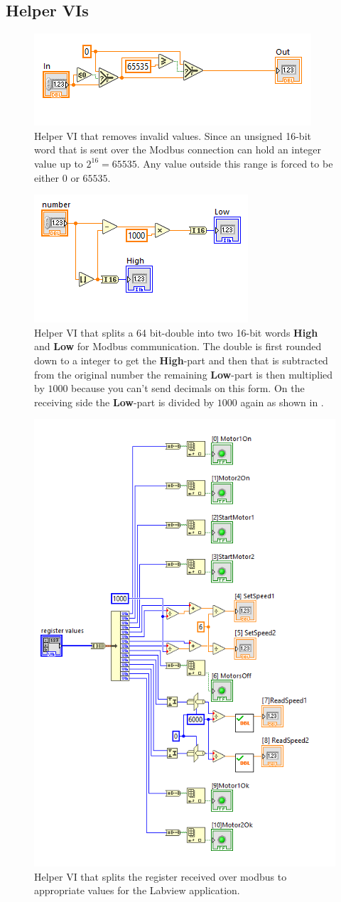 \subsection{Helper VIs}
\begin{figure}[H]
    \centering
    \includegraphics[width=0.5\linewidth]{vis/Remove invalid values.PNG}
    \caption{Helper VI that removes invalid values. Since an unsigned 16-bit word that is sent over the Modbus connection can hold an integer value up to $2^{16} = 65535$. Any value outside this range is forced to be either $0$ or $65535$.}
    \label{fig:RIV}
\end{figure}
\begin{figure}[H]
    \centering
    \includegraphics[width=0.5\linewidth]{vis/SplitDouble.PNG}
    \caption{Helper VI that splits a 64 bit-double into two 16-bit words \textbf{High} and \textbf{Low} for Modbus communication. The double is first rounded down to a integer to get the \textbf{High}-part and then that is subtracted from the original number the remaining \textbf{Low}-part is then multiplied by $1000$ because you can't send decimals on this form. On the receiving side the \textbf{Low}-part is divided by $1000$ again as shown in .}
    \label{fig:SplitDouble}
\end{figure}

\begin{figure}[H]
    \centering
    \includegraphics[width=0.5\linewidth]{vis/RegisterSplit.PNG}
    \caption{Helper VI that splits the register received over modbus to appropriate values for the Labview application.}
    \label{fig:RegisterSplit}
\end{figure}

